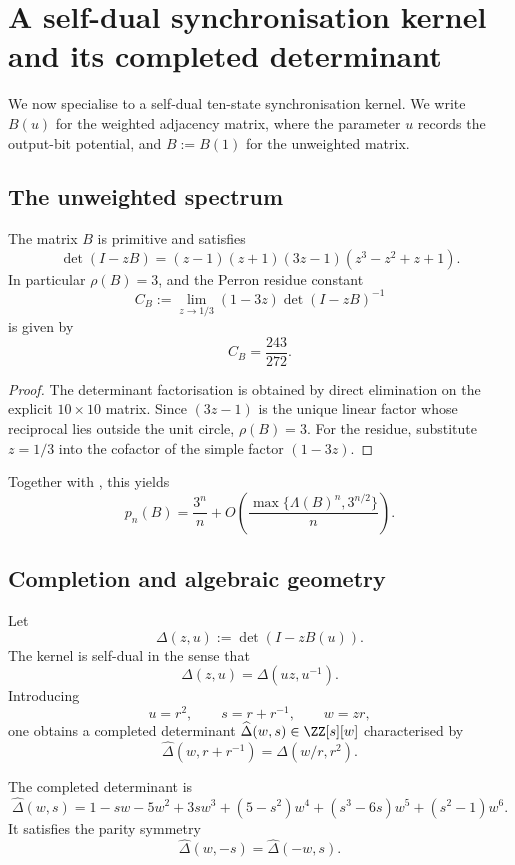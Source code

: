 \section{A self-dual synchronisation kernel and its completed determinant}
\label{sec:online-kernel}

We now specialise to a self-dual ten-state synchronisation kernel. We
write $B(u)$ for the weighted adjacency matrix, where the parameter
$u$ records the output-bit potential, and $B:=B(1)$ for the unweighted
matrix.

\subsection{The unweighted spectrum}

\begin{proposition}
  \label{prop:sync-kernel-spectrum}
  The matrix $B$ is primitive and satisfies
  \[
    \det(I-zB)=(z-1)(z+1)(3z-1)(z^3-z^2+z+1).
  \]
  In particular $\rho(B)=3$, and the Perron residue constant
  \[
    C_B:=\lim_{z\to 1/3}(1-3z)\det(I-zB)^{-1}
  \]
  is given by
  \[
    C_B=\frac{243}{272}.
  \]
\end{proposition}

\begin{proof}
  The determinant factorisation is obtained by direct elimination on
  the explicit $10\times 10$ matrix. Since $(3z-1)$ is the unique
  linear factor whose reciprocal lies outside the unit circle,
  $\rho(B)=3$. For the residue, substitute $z=1/3$ into the cofactor of
  the simple factor $(1-3z)$.
\end{proof}

Together with , this yields
\[
  p_n(B)=\frac{3^n}{n}+O\!\left(\frac{\max\{\Lambda(B)^n,3^{n/2}\}}{n}\right).
\]

\subsection{Completion and algebraic geometry}

Let
\[
  \Delta(z,u):=\det(I-zB(u)).
\]
The kernel is self-dual in the sense that
\[
  \Delta(z,u)=\Delta(uz,u^{-1}).
\]
Introducing
\[
  u=r^2,\qquad s=r+r^{-1},\qquad w=zr,
\]
one obtains a completed determinant
$\widehat\Delta(w,s)\in\ZZ[s][w]$ characterised by
\[
  \widehat\Delta(w,r+r^{-1})=\Delta(w/r,r^2).
\]

\begin{proposition}
  \label{prop:sync-hatdelta-completion}
  The completed determinant is
  \[
    \widehat\Delta(w,s)
    =1-sw-5w^2+3sw^3+(5-s^2)w^4+(s^3-6s)w^5+(s^2-1)w^6.
  \]
  It satisfies the parity symmetry
  \[
    \widehat\Delta(w,-s)=\widehat\Delta(-w,s).
  \]
\end{proposition}

